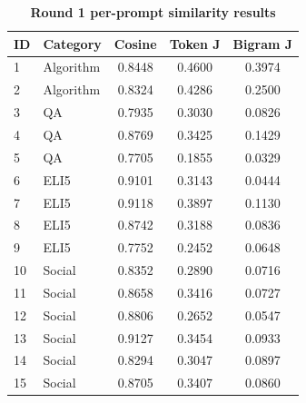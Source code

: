 \begin{table}[htbp]
\centering
\caption{\textbf{Round 1 per-prompt similarity results}}
\label{tab:round1-similarity-per-prompt}
\renewcommand{\arraystretch}{1.4}
\begin{tabular}{|l|l|c|c|c|}
\hline
\textbf{ID} & \textbf{Category} & \textbf{Cosine} & \textbf{Token J} & \textbf{Bigram J} \\
\hline
1 & Algorithm & 0.8448 & 0.4600 & 0.3974 \\
\hline
2 & Algorithm & 0.8324 & 0.4286 & 0.2500 \\
\hline
3 & QA & 0.7935 & 0.3030 & 0.0826 \\
\hline
4 & QA & 0.8769 & 0.3425 & 0.1429 \\
\hline
5 & QA & 0.7705 & 0.1855 & 0.0329 \\
\hline
6 & ELI5 & 0.9101 & 0.3143 & 0.0444 \\
\hline
7 & ELI5 & 0.9118 & 0.3897 & 0.1130 \\
\hline
8 & ELI5 & 0.8742 & 0.3188 & 0.0836 \\
\hline
9 & ELI5 & 0.7752 & 0.2452 & 0.0648 \\
\hline
10 & Social & 0.8352 & 0.2890 & 0.0716 \\
\hline
11 & Social & 0.8658 & 0.3416 & 0.0727 \\
\hline
12 & Social & 0.8806 & 0.2652 & 0.0547 \\
\hline
13 & Social & 0.9127 & 0.3454 & 0.0933 \\
\hline
14 & Social & 0.8294 & 0.3047 & 0.0897 \\
\hline
15 & Social & 0.8705 & 0.3407 & 0.0860 \\
\hline
\end{tabular}
\end{table}
